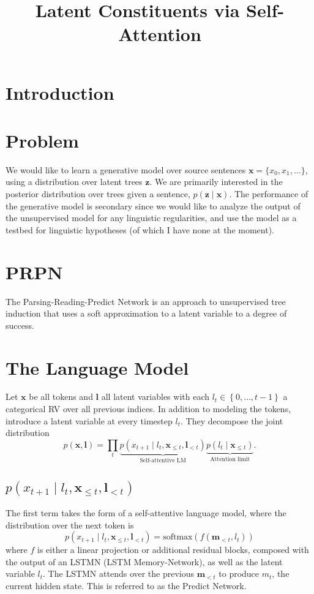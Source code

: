 \documentclass{article}
\title{Latent Constituents via Self-Attention}
\newcommand\set[1]{\left\{#1\right\}}
\newcommand{\bl}{\mathbf{l}}
\newcommand{\bx}{\mathbf{x}}
\newcommand{\bz}{\mathbf{z}}
\begin{document}
\maketitle

\section{Introduction}


\section{Problem}
We would like to learn a generative model
over source sentences $\bx = \{x_0, x_1, \ldots\}$,
using a distribution over latent trees $\bz$.  
We are primarily interested in the posterior distribution over trees given a sentence, $p(\bz\mid\bx)$.
The performance of the generative model is secondary since we would like to analyze the
output of the unsupervised model for any linguistic regularities, and use the model as a 
testbed for linguistic hypotheses (of which I have none at the moment).

\citep{shen2018prpn}
\citet{yin18structvae}

\section{PRPN \citep{shen2018prpn}}
The Parsing-Reading-Predict Network \citep{shen2018prpn} is an approach to unsupervised tree induction
that uses a soft approximation to a latent variable to a degree of success.

\section{The Language Model}
Let $\bx$ be all tokens
and $\bl$ all latent variables with each $l_t\in\set{0,\ldots,t-1}$ a categorical RV over all previous indices.
In addition to modeling the tokens,
\citet{shen2018prpn} introduce a latent variable at every timestep $l_t$. 
They decompose the joint distribution 
\begin{equation}
p(\bx, \bl)
= \prod_t \underbrace{p(x_{t+1}\mid l_t,\bx_{\le t},\bl_{<t})}_{\textrm{Self-attentive LM}}
\underbrace{p(l_t\mid\bx_{\le t})}_{\textrm{Attention limit}}.
\end{equation}

\subsection{$p(x_{t+1}\mid l_t,\bx_{\le t},\bl_{<t})$}
The first term takes the form of a self-attentive language model,
where the distribution over the next token is
$$p(x_{t+1}\mid l_t,\bx_{\le t},\bl_{<t}) = \textrm{softmax}(f(\bm{m}_{<t}, l_t))$$
where $f$ is either a linear projection or additional residual blocks,
composed with the output of an LSTMN (LSTM Memory-Network),
as well as the latent variable $l_t$.
The LSTMN attends over the previous $\bm{m}_{<t}$ to produce $m_t$,
the current hidden state.
This is referred to as the Predict Network.
\end{document}
